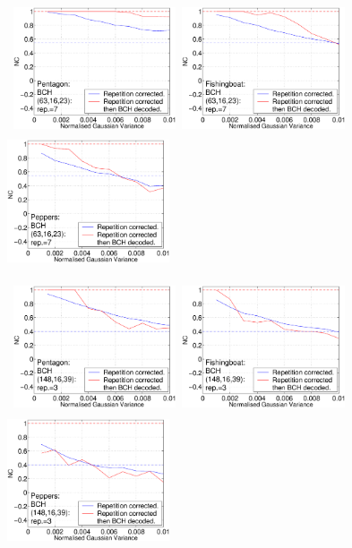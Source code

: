 \documentclass[12pt]{report}
\begin{document}
\begin{figure}[p]
\centerline{ \hbox{
\includegraphics[height=3.81cm,width=4.8cm]{EPS_BK_formattedBetter/WGpent63.eps}
\includegraphics[height=3.81cm,width=4.8cm]{EPS_BK_formattedBetter/WGfish63.eps}
\includegraphics[height=3.81cm,width=4.8cm]{EPS_BK_formattedBetter/WGpep63.eps}
}}
 
\centerline{ \hbox{
\includegraphics[height=3.81cm,width=4.8cm]{EPS_BK_formattedBetter/WGpent148.eps}
\includegraphics[height=3.81cm,width=4.8cm]{EPS_BK_formattedBetter/WGfish148.eps}
\includegraphics[height=3.81cm,width=4.8cm]{EPS_BK_formattedBetter/WGpep148.eps}
}}
 

\end{figure}
\end{document}
